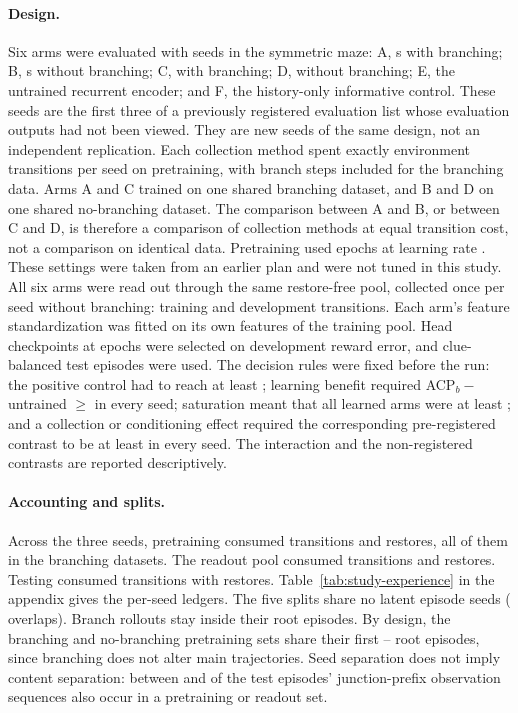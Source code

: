 \paragraph{Design.}
Six arms were evaluated with seeds \StudyCfgSeeds{} in the symmetric maze: A, \acp{} with branching; B, \acp{} without branching; C, \msp{} with branching; D, \msp{} without branching; E, the untrained recurrent encoder; and F, the history-only informative control. These seeds are the first three of a previously registered evaluation list whose evaluation outputs had not been viewed. They are new seeds of the same design, not an independent replication. Each collection method spent exactly \StudyCfgPretrainBudget{} environment transitions per seed on pretraining, with branch steps included for the branching data. Arms A and C trained on one shared branching dataset, and B and D on one shared no-branching dataset. The comparison between A and B, or between C and D, is therefore a comparison of collection methods at equal transition cost, not a comparison on identical data. Pretraining used \StudyCfgPretrainEpochs{} epochs at learning rate \StudyCfgPretrainLR{}. These settings were taken from an earlier plan and were not tuned in this study. All six arms were read out through the same restore-free pool, collected once per seed without branching: \StudyCfgPoolTrain{} training and \StudyCfgPoolDev{} development transitions. Each arm's feature standardization was fitted on its own features of the training pool. Head checkpoints at \StudyCfgHeadEpochs{} epochs were selected on development reward error, and \StudyCfgNTest{} clue-balanced test episodes were used. The decision rules were fixed before the run: the positive control had to reach at least \StudyCfgPosMin{}; learning benefit required ACP$_b-$untrained $\geq$ \StudyCfgMIE{} in every seed; saturation meant that all learned arms were at least \StudyCfgSatMin{}; and a collection or conditioning effect required the corresponding pre-registered contrast to be at least \StudyCfgMIE{} in every seed. The interaction and the non-registered contrasts are reported descriptively.

\paragraph{Accounting and splits.}
Across the three seeds, pretraining consumed \StudyPretrainTransitions{} transitions and \StudyPretrainRestores{} restores, all of them in the branching datasets. The readout pool consumed \StudyPoolTransitions{} transitions and \StudyPoolTrainRestores{} restores. Testing consumed \StudyTestTransitions{} transitions with \StudyTestRestores{} restores. Table~\ref{tab:study-experience} in the appendix gives the per-seed ledgers. The five splits share no latent episode seeds (\StudyLatentSeedOverlapTotal{} overlaps). Branch rollouts stay inside their root episodes. By design, the branching and no-branching pretraining sets share their first \StudySharedRootsMin--\StudySharedRootsMax{} root episodes, since branching does not alter main trajectories. Seed separation does not imply content separation: between \StudyPrefixOverlapMin{} and \StudyPrefixOverlapMax{} of the test episodes' junction-prefix observation sequences also occur in a pretraining or readout set.

